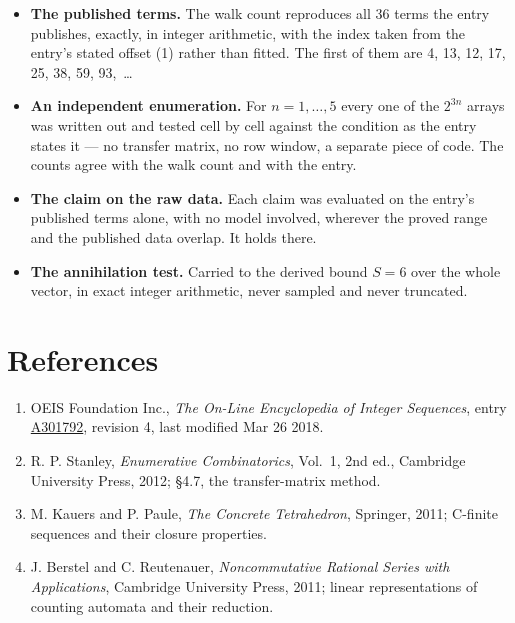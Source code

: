 \documentclass[11pt]{article}
\theoremstyle{definition}
\begin{document}
\begin{itemize}

\item {\bfseries The published terms.} The walk count reproduces all 36 terms the entry publishes, exactly, in integer arithmetic, with the index taken from the entry's stated offset (1) rather than fitted. The first of them are 4, 13, 12, 17, 25, 38, 59, 93,~\dots

\item {\bfseries An independent enumeration.} For $n = 1,\dots,5$ every one of the $2^{3n}$ arrays was written out and tested cell by cell against the condition as the entry states it --- no transfer matrix, no row window, a separate piece of code. The counts agree with the walk count and with the entry.

\item {\bfseries The claim on the raw data.} Each claim was evaluated on the entry's published terms alone, with no model involved, wherever the proved range and the published data overlap. It holds there.

\item {\bfseries The annihilation test.} Carried to the derived bound $S = 6$ over the whole vector, in exact integer arithmetic, never sampled and never truncated.

\end{itemize}

\section{References}

\begin{enumerate}

\item OEIS Foundation Inc., \emph{The On-Line Encyclopedia of Integer Sequences}, entry \href{https://oeis.org/A301792}{A301792}, revision 4, last modified Mar 26 2018.

\item R. P. Stanley, \emph{Enumerative Combinatorics}, Vol.~1, 2nd ed., Cambridge University Press, 2012; \S4.7, the transfer-matrix method.

\item M. Kauers and P. Paule, \emph{The Concrete Tetrahedron}, Springer, 2011; C-finite sequences and their closure properties.

\item J. Berstel and C. Reutenauer, \emph{Noncommutative Rational Series with Applications}, Cambridge University Press, 2011; linear representations of counting automata and their reduction.

\end{enumerate}
\end{document}
